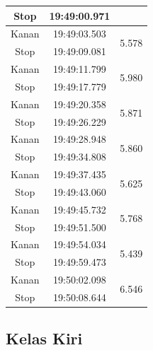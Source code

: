 \begin{longtable}{|c|c|c|}
  Stop           & 19:49:00.971        &                         \\ \hline
  Kanan          & 19:49:03.503        & \multirow{2}{*}{5.578}  \\ \cline{1-2}
  Stop           & 19:49:09.081        &                         \\ \hline
  Kanan          & 19:49:11.799        & \multirow{2}{*}{5.980}  \\ \cline{1-2}
  Stop           & 19:49:17.779        &                         \\ \hline
  Kanan          & 19:49:20.358        & \multirow{2}{*}{5.871}  \\ \cline{1-2}
  Stop           & 19:49:26.229        &                         \\ \hline
  Kanan          & 19:49:28.948        & \multirow{2}{*}{5.860}  \\ \cline{1-2}
  Stop           & 19:49:34.808        &                         \\ \hline
  Kanan          & 19:49:37.435        & \multirow{2}{*}{5.625}  \\ \cline{1-2}
  Stop           & 19:49:43.060        &                         \\ \hline
  Kanan          & 19:49:45.732        & \multirow{2}{*}{5.768}  \\ \cline{1-2}
  Stop           & 19:49:51.500        &                         \\ \hline
  Kanan          & 19:49:54.034        & \multirow{2}{*}{5.439}  \\ \cline{1-2}
  Stop           & 19:49:59.473        &                         \\ \hline
  Kanan          & 19:50:02.098        & \multirow{2}{*}{6.546}  \\ \cline{1-2}
  Stop           & 19:50:08.644        &                         \\ \hline
\end{longtable}

\subsection{Kelas Kiri}

